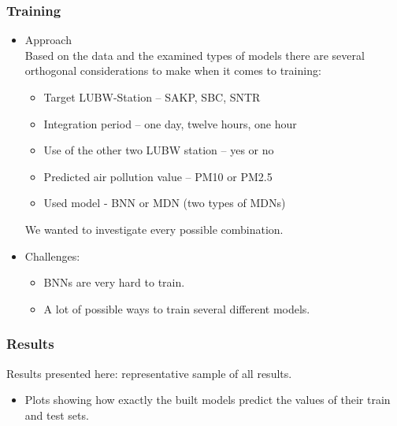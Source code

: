 \documentclass[18pt]{beamer}
\begin{document}
\begin{frame}
  \frametitle{Training}
  \begin{itemize}
  \item Approach \\
    Based on the data and the examined types of models there are several orthogonal considerations to make when it comes to training:
    \begin{itemize}
    \item Target LUBW-Station -- SAKP, SBC, SNTR
    \item Integration period -- one day, twelve hours, one hour
    \item Use of the other two LUBW station -- yes or no
    \item Predicted air pollution value -- PM10 or PM2.5
    \item Used model - BNN or MDN (two types of MDNs)
    \end{itemize}
    We wanted to investigate every possible combination.
  \item Challenges:
    \begin{itemize}
    \item BNNs are very hard to train.
    \item A lot of possible ways to train several different models.
    \end{itemize}
  \end{itemize}
\end{frame}


\begin{frame}[t]
  \frametitle{Results}
  Results presented here: representative sample of all results.
  \pause
  \begin{itemize}
  \item Plots showing how exactly the built models predict the values of their train and test sets.
  \end{itemize}
\end{frame}
\end{document}
